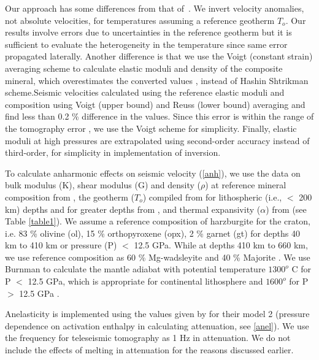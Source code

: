 \documentclass[draft,linenumbers]{agujournal2018}
\begin{document}
Our approach has some differences from that of~\citet{Cammarano2003}. We invert velocity anomalies, not absolute velocities, for temperatures assuming a reference geotherm $T_o$. Our results involve errors due to uncertainties in the reference geotherm but it is sufficient to evaluate the heterogeneity in the temperature since same error propagated laterally. Another difference is that we use the Voigt (constant strain) averaging scheme to calculate elastic moduli and density of the composite mineral, which overestimates the converted values \citep{watt_1976}, instead of Hashin Shtrikman scheme.Seismic velocities calculated using the reference elastic moduli and composition using Voigt (upper bound) and Reuss (lower bound) averaging and find less than 0.2 \% difference in the values. Since this error is within the range of the tomography error \citep{Biryol_2016}, we use the Voigt scheme for simplicity. Finally, elastic moduli at high pressures are extrapolated using second-order accuracy instead of third-order, for simplicity in implementation of inversion.  

To calculate anharmonic effects on seismic velocity (\ref{anh}), we use the data on bulk modulus (K), shear modulus (G) and density ($\rho$) at reference mineral composition from \citet{Cammarano2003}, the geotherm ($T_o$) compiled from \citet{Goes_2002} for lithospheric (i.e., $<$ 200 km) depths and for greater depths from \citet{turcotte2014geodynamics}, and thermal expansivity ($\alpha$) from \citet{saxena_data} (see Table \ref{table1}). We assume a reference composition of harzburgite for the craton, i.e. 83 \% olivine (ol), 15 \% orthopyroxene (opx), 2 \% garnet (gt) \citep{mcdonough1998mineralogy} for depths 40 km to 410 km or pressure (P) $<$ 12.5 GPa. While at depths 410 km to 660 km, we use reference composition as 60 \% Mg-wadsleyite and 40 \% Majorite  \citep{haggerty1995upper}. We use Burnman \citep{cottaar2014burnman} to calculate the mantle adiabat with potential temperature $1300^o$ C for P $<$ 12.5 GPa, which is appropriate for continental lithosphere \citep{rudnick1998thermal} and $1600^o$ for P $>$ 12.5 GPa \citep{katsura2010adiabatic}. 

Anelasticity is implemented using the values given by \citet{sobolev1996upper} for their model 2 (pressure dependence on activation enthalpy in calculating attenuation, see \ref{anel}). We use the frequency for teleseismic tomography as 1 Hz in attenuation. We do not include the effects of melting in attenuation for the reasons discussed earlier.
\end{document}
